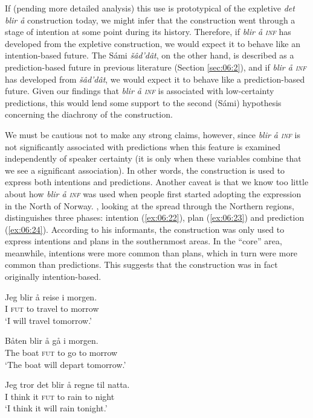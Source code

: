 \documentclass[output=paper,colorlinks,citecolor=brown]{langscibook}
\begin{document}
If (pending more detailed analysis) this use is prototypical of the expletive \textit{det blir å} construction today, we might infer that the construction went through a stage of intention at some point during its history. Therefore, if \textit{blir å \textsc{inf}} has developed from the expletive construction, we would expect it to behave like an intention-based future. The Sámi \textit{šâd’dât}, on the other hand, is described as a prediction-based future in previous literature (Section \ref{sec:06:2}), and if \textit{blir å \textsc{inf}} has developed from  \textit{šâd’dât}, we would expect it to behave like a prediction-based future. Given our findings that \textit{blir å \textsc{inf}} is associated with low-certainty predictions, this would lend some support to the second (Sámi) hypothesis concerning the diachrony of the construction.

We must be cautious not to make any strong claims, however, since \textit{blir å \textsc{inf}} is not significantly associated with predictions when this feature is examined independently of speaker certainty (it is only when these variables combine that we see a significant association). In other words, the construction is used to express both intentions and predictions. Another caveat is that we know too little about how \textit{blir å \textsc{inf}} was used when people first started adopting the expression in the North of Norway. \citet{vannebo1979}, looking at the spread through the Northern regions, distinguishes three phases: intention (\ref{ex:06:22}), plan (\ref{ex:06:23}) and prediction (\ref{ex:06:24}). According to his informants, the construction was only used to express intentions and plans in the southernmost areas. In the “core” area, meanwhile, intentions were more common than plans, which in turn were more common than predictions. This suggests that the construction was in fact originally intention-based.

\ea\label{ex:06:22}
\gll Jeg blir å reise i morgen.\\
     I \textsc{fut} to travel to morrow\\
\glt ‘I will travel tomorrow.’ \citep{vannebo1979}
\z

\ea\label{ex:06:23}
\gll Båten blir å gå i morgen.\\
     The boat \textsc{fut} to go to morrow\\
\glt ‘The boat will depart tomorrow.’ \citep{vannebo1979}
\z

\ea\label{ex:06:24}
\gll Jeg tror det blir å regne til natta.\\
     I think it \textsc{fut} to rain to night\\
\glt ‘I think it will rain tonight.’ \citep{vannebo1979}
\z
\end{document}
